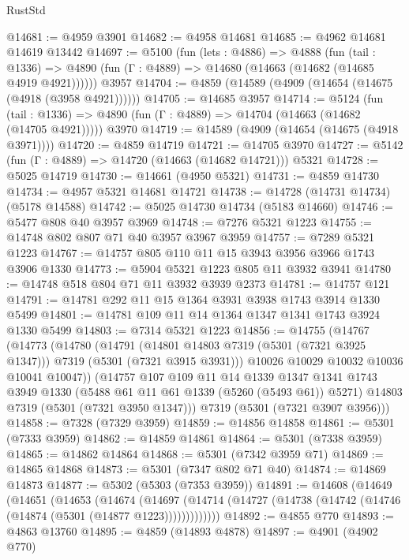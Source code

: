\begin{lexlean}{RustStd}
\begin{coremodule}
@14681 := @4959 @3901
@14682 := @4958 @14681
@14685 := @4962 @14681 @14619 @13442
@14697 := @5100
    (fun (lets : @4886) =>
    @4888
      (fun (tail : @1336) =>
      @4890 (fun (Γ : @4889) => @14680 (@14663 (@14682 (@14685 @4919 @4921))))))
    @3957
@14704 := @4859 (@14589 (@4909 (@14654 (@14675 (@4918 (@3958 @4921))))))
@14705 := @14685 @3957
@14714 := @5124
    (fun (tail : @1336) => @4890 (fun (Γ : @4889) => @14704 (@14663 (@14682 (@14705 @4921)))))
    @3970
@14719 := @14589 (@4909 (@14654 (@14675 (@4918 @3971))))
@14720 := @4859 @14719
@14721 := @14705 @3970
@14727 := @5142 (fun (Γ : @4889) => @14720 (@14663 (@14682 @14721))) @5321
@14728 := @5025 @14719
@14730 := @14661 (@4950 @5321)
@14731 := @4859 @14730
@14734 := @4957 @5321 @14681 @14721
@14738 := @14728 (@14731 @14734) (@5178 @14588)
@14742 := @5025 @14730 @14734 (@5183 @14660)
@14746 := @5477 @808 @40 @3957 @3969
@14748 := @7276 @5321 @1223
@14755 := @14748 @802 @807 @71 @40 @3957 @3967 @3959
@14757 := @7289 @5321 @1223
@14767 := @14757 @805 @110 @11 @15 @3943 @3956 @3966 @1743 @3906 @1330
@14773 := @5904 @5321 @1223 @805 @11 @3932 @3941
@14780 := @14748 @518 @804 @71 @11 @3932 @3939 @2373
@14781 := @14757 @121
@14791 := @14781 @292 @11 @15 @1364 @3931 @3938 @1743 @3914 @1330 @5499
@14801 := @14781 @109 @11 @14 @1364 @1347 @1341 @1743 @3924 @1330 @5499
@14803 := @7314 @5321 @1223
@14856 := @14755
    (@14767
      (@14773
        (@14780
          (@14791
            (@14801 @14803 @7319 (@5301 (@7321 @3925 @1347)))
            @7319
            (@5301 (@7321 @3915 @3931)))
          @10026
          @10029
          @10032
          @10036
          @10041
          @10047))
      (@14757
        @107
        @109
        @11
        @14
        @1339
        @1347
        @1341
        @1743
        @3949
        @1330
        (@5488 @61 @11 @61 @1339 (@5260 (@5493 @61)) @5271)
        @14803
        @7319
        (@5301 (@7321 @3950 @1347)))
      @7319
      (@5301 (@7321 @3907 @3956)))
@14858 := @7328 (@7329 @3959)
@14859 := @14856 @14858
@14861 := @5301 (@7333 @3959)
@14862 := @14859 @14861
@14864 := @5301 (@7338 @3959)
@14865 := @14862 @14864
@14868 := @5301 (@7342 @3959 @71)
@14869 := @14865 @14868
@14873 := @5301 (@7347 @802 @71 @40)
@14874 := @14869 @14873
@14877 := @5302 (@5303 (@7353 @3959))
@14891 := @14608
    (@14649
      (@14651
        (@14653
          (@14674
            (@14697
              (@14714 (@14727 (@14738 (@14742 (@14746 (@14874 (@5301 (@14877 @1223)))))))))))))
@14892 := @4855 @770
@14893 := @4863 @13760
@14895 := @4859 (@14893 @4878)
@14897 := @4901 (@4902 @770)

\end{coremodule}
\end{lexlean}
